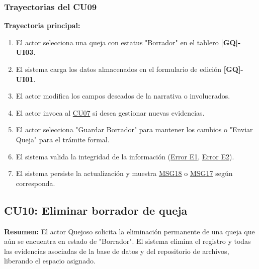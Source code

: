 \begin{appendices}
\subsubsection{Trayectorias del CU09}

\textbf{Trayectoria principal:}
\begin{enumerate}[nosep]
    \item El actor selecciona una queja con estatus "Borrador" en el tablero \textbf{[GQ]-UI03}.
    \item El sistema carga los datos almacenados en el formulario de edición \textbf{[GQ]-UI01}.
    \item El actor modifica los campos deseados de la narrativa o involucrados.
    \item El actor invoca al \hyperlink{anexo:casos_uso}{CU07} si desea gestionar nuevas evidencias.
    \item El actor selecciona "Guardar Borrador" para mantener los cambios o "Enviar Queja" para el trámite formal.
    \item El sistema valida la integridad de la información (\hyperlink{err:E10}{Error E1}, \hyperlink{err:E11}{Error E2}).
    \item El sistema persiste la actualización y muestra \hyperlink{msg:MSG18}{MSG18} o \hyperlink{msg:MSG17}{MSG17} según corresponda.
\end{enumerate}


\subsection{CU10: Eliminar borrador de queja}

\textbf{Resumen:} 
El actor Quejoso solicita la eliminación permanente de una queja que aún se encuentra en estado de "Borrador". El sistema elimina el registro y todas las evidencias asociadas de la base de datos y del repositorio de archivos, liberando el espacio asignado.


\end{appendices}
